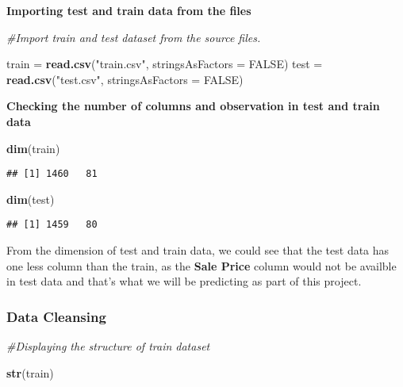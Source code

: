 \documentclass[]{article}
\newenvironment{Shaded}{\begin{snugshade}}{\end{snugshade}}
\newcommand{\KeywordTok}[1]{\textcolor[rgb]{0.13,0.29,0.53}{\textbf{#1}}}
\newcommand{\DataTypeTok}[1]{\textcolor[rgb]{0.13,0.29,0.53}{#1}}
\newcommand{\StringTok}[1]{\textcolor[rgb]{0.31,0.60,0.02}{#1}}
\newcommand{\CommentTok}[1]{\textcolor[rgb]{0.56,0.35,0.01}{\textit{#1}}}
\newcommand{\OtherTok}[1]{\textcolor[rgb]{0.56,0.35,0.01}{#1}}
\newcommand{\NormalTok}[1]{#1}
\begin{document}
\textbf{Importing test and train data from the files}

\begin{Shaded}
\begin{Highlighting}[]
\CommentTok{#Import train and test dataset from the source files.}

\NormalTok{train =}\StringTok{ }\KeywordTok{read.csv}\NormalTok{(}\StringTok{"train.csv"}\NormalTok{, }\DataTypeTok{stringsAsFactors =} \OtherTok{FALSE}\NormalTok{) }
\NormalTok{test =}\StringTok{ }\KeywordTok{read.csv}\NormalTok{(}\StringTok{"test.csv"}\NormalTok{, }\DataTypeTok{stringsAsFactors =} \OtherTok{FALSE}\NormalTok{)}
\end{Highlighting}
\end{Shaded}

\textbf{Checking the number of columns and observation in test and train
data}

\begin{Shaded}
\begin{Highlighting}[]
\KeywordTok{dim}\NormalTok{(train)}
\end{Highlighting}
\end{Shaded}

\begin{verbatim}
## [1] 1460   81
\end{verbatim}

\begin{Shaded}
\begin{Highlighting}[]
\KeywordTok{dim}\NormalTok{(test)}
\end{Highlighting}
\end{Shaded}

\begin{verbatim}
## [1] 1459   80
\end{verbatim}

From the dimension of test and train data, we could see that the test
data has one less column than the train, as the \textbf{Sale Price}
column would not be availble in test data and that's what we will be
predicting as part of this project.

\subsubsection{Data Cleansing}\label{data-cleansing}

\begin{Shaded}
\begin{Highlighting}[]
\CommentTok{#Displaying the structure of train dataset}

\KeywordTok{str}\NormalTok{(train)}
\end{Highlighting}
\end{Shaded}
\end{document}

